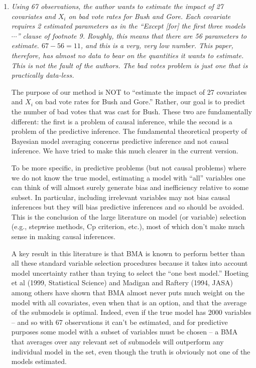 \documentclass[11pt]{article}
\begin{document}
\begin{enumerate}
  
\item {\it Using 67 observations, the author wants to estimate the
    impact of 27 covariates and $X_i$ on bad vote rates for Bush and
    Gore.  Each covariate requires 2 estimated parameters as in the
    ``Except [for] the first three models $\cdots$'' clause of
    footnote 9.  Roughly, this means that there are 56 parameters to
    estimate.  $67-56=11$, and this is a very, very low number. This
    paper, therefore, has almost no data to bear on the quantities it
    wants to estimate.  This is not the fault of the authors.  The bad
    votes problem is just one that is practically data-less.}
  
  The purpose of our method is NOT to ``estimate the impact of 27
  covariates and $X_i$ on bad vote rates for Bush and Gore.'' Rather,
  our goal is to predict the number of bad votes that was cast for
  Bush. These two are fundamentally different: the first is a problem
  of causal inference, while the second is a problem of the predictive
  inference. The fundamental theoretical property of Bayesian model
  averaging concerns predictive inference and not causal inference.
  We have tried to make this much clearer in the current version.
  
  To be more specific, in predictive problems (but not causal
  problems) where we do not know the true model, estimating a model
  with ``all'' variables one can think of will almost surely generate
  bias and inefficiency relative to some subset.  In particular,
  including irrelevant variables may not bias causal inferences but
  they will bias predictive inferences and so should be avoided.  This
  is the conclusion of the large literature on model (or variable)
  selection (e.g., stepwise methods, Cp criterion, etc.), most of
  which don't make much sense in making causal inferences.
  
  A key result in this literature is that BMA is known to perform
  better than all these standard variable selection procedures because
  it takes into account model uncertainty rather than trying to select
  the ``one best model.''  Hoeting et al (1999, Statistical Science)
  and Madigan and Raftery (1994, JASA) among others have shown that
  BMA almost never puts much weight on the model with all covariates,
  even when that is an option, and that the average of the submodels
  is optimal.  Indeed, even if the true model has 2000 variables --
  and so with 67 observations it can't be estimated, and for
  predictive purposes some model with a subset of variables must be
  chosen -- a BMA that averages over any relevant set of submodels
  will outperform any individual model in the set, even though the
  truth is obviously not one of the models estimated.  
 

\end{enumerate}
\end{document}
